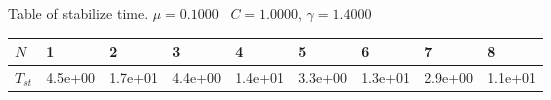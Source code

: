 \begin{center}
Table of stabilize time. $\mu = 0.1000$ \, $C = 1.0000$, $\gamma = 1.4000$
  
\begin{tabular}{|p{0.6in}|p{0.6in}|p{0.6in}|p{0.6in}|p{0.6in}|p{0.6in}|p{0.6in}|p{0.6in}|p{0.6in}|} \hline
$N$ &1 &2 &3 &4 &5 &6 &7 &8 \\ \hline 
$T_{st}$ &4.5e+00 &1.7e+01 &4.4e+00 &1.4e+01 &3.3e+00 &1.3e+01 &2.9e+00 &1.1e+01 \\ \hline 

\end{tabular}\\[20pt]
\end{center}
